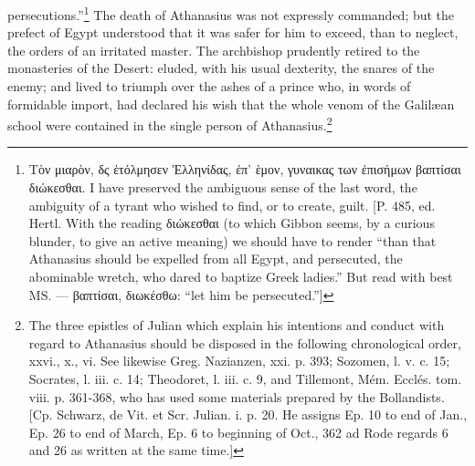 persecutions.\texthebrew{}”\footnote{\textgreek{Τ\texthebrew{ὸ}ν μιαρ\texthebrew{ὸ}ν, δς \texthebrew{ἑ}τόλμησεν \texthebrew{Ἑ}λληνίδας, \texthebrew{ἐ}π\texthebrew{’ ὲ}μον, γυναικας των \texthebrew{ἐ}πισήμων βαπτίσαι διώκεσθαι}. I have preserved the ambiguous sense of the last word, the ambiguity of a tyrant who wished to find, or to create, guilt. [P. 485, ed. Hertl. With the reading \textgreek{διώκεσθαι} (to which Gibbon seems, by a curious blunder, to give an active meaning) we should have to render \texthebrew{“}than that Athanasius should be expelled from all Egypt, and persecuted, the abominable wretch, who dared to baptize Greek ladies.\texthebrew{}” But read with best MS. \texthebrew{—} \textgreek{βαπτίσαι, διωκέσθω}: \texthebrew{“}let him be persecuted.\texthebrew{}”]} The death of Athanasius was not expressly commanded; but the prefect of Egypt understood that it was safer for him to exceed, than to neglect, the orders of an irritated master. The archbishop prudently retired to the monasteries of the Desert: eluded, with his usual dexterity, the snares of the enemy; and lived to triumph over the ashes of a prince who, in words of formidable import, had declared his wish that the whole venom of the Galilæan school were contained in the single person of Athanasius.\footnote{The three epistles of Julian which explain his intentions and conduct with regard to Athanasius should be disposed in the following chronological order, xxvi., x., vi. See likewise Greg. Nazianzen, xxi. p. 393; Sozomen, l. v. c. 15; Socrates, l. iii. c. 14; Theodoret, l. iii. c. 9, and Tillemont, Mém. Ecclés. tom. viii. p. 361-368, who has used some materials prepared by the Bollandists. [Cp. Schwarz, de Vit. et Scr. Julian. i. p. 20. He assigns Ep. 10 to end of Jan., Ep. 26 to end of March, Ep. 6 to beginning of Oct., 362 ad Rode regards 6 and 26 as written at the same time.]}

